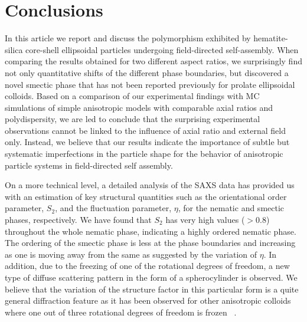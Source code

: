 \documentclass[aps,prl,preprint,superscriptaddress,showkeys]{revtex4-2} %
\begin{document}
\section{Conclusions}
In this article we report and discuss the polymorphism exhibited by hematite-silica core-shell ellipsoidal particles undergoing field-directed self-assembly. When comparing the results obtained for two different aspect ratios, we surprisingly find not only quantitative shifts of the different phase boundaries, but discovered a novel smectic phase that has not been reported previously for prolate ellipsoidal colloids. Based on a comparison of our experimental findings with MC simulations of simple anisotropic models with comparable axial ratios and polydispersity, we are led to conclude that the surprising experimental observations cannot be linked to the influence of axial ratio and external field only. Instead, we believe that our results indicate the importance of subtle but systematic imperfections in the particle shape for the behavior of anisotropic particle systems in field-directed self assembly.\par
On a more technical level, a detailed analysis of the SAXS data has provided us with an estimation of key structural quantities such as the orientational order parameter, $S_2$, and the fluctuation parameter, $\eta$, for the nematic and smectic phases, respectively. We have found that $S_2$ has very high values ($>0.8$) throughout the whole nematic phase, indicating a highly ordered nematic phase. The ordering of the smectic phase is less at the phase boundaries and increasing as one is moving away from the same as suggested by the variation of $\eta$. In addition, due to the freezing of one of the rotational degrees of freedom, a new type of diffuse scattering pattern in the form of a spherocylinder is observed. We believe that the variation of the structure factor in this particular form is a quite general diffraction feature as it has been observed for other anisotropic colloids where one out of three rotational degrees of freedom is frozen ~\cite{kamal2020path}.\par 
\end{document}
